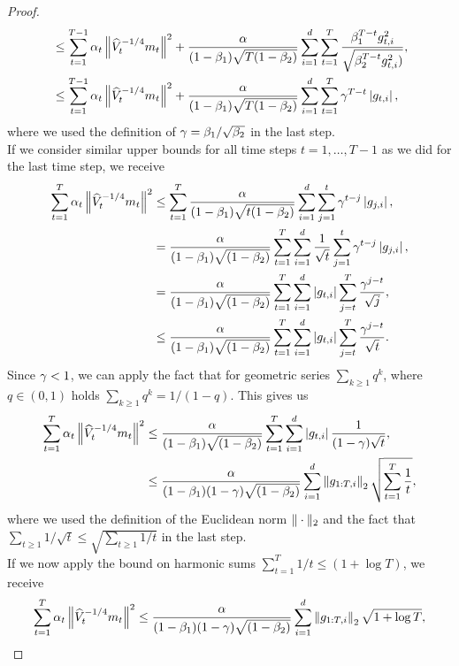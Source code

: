 \begin{proof}
\begin{align*}
&\leq \sum_{t=1}^{T-1} \alpha_t \left\| \widehat{V}_t^{-1/4} m_t \right\|^2 + \frac{\alpha}{(1-\beta_1)\sqrt{T(1-\beta_2)}} \sum_{i=1}^{d} \sum_{t=1}^T\frac{\beta_1^{T-t}g_{t,i}^2}{\sqrt{\beta_2^{T-t}g_{t,i}^2)}},\\
&\leq \sum_{t=1}^{T-1} \alpha_t \left\| \widehat{V}_t^{-1/4} m_t \right\|^2 + \frac{\alpha}{(1-\beta_1)\sqrt{T(1-\beta_2)}} \sum_{i=1}^{d} \sum_{t=1}^T\operatorname{\gamma}^{T-t}\left|g_{t,i}\right|,
\end{align*}
where we used the definition of $\operatorname{\gamma} = \beta_1/\sqrt{\beta_2}$ in the last step.\\
If we consider similar upper bounds for all time steps $t=1,\ldots,T-1$ as we did for the last time step, we receive
\begin{align*}
\sum_{t=1}^T \alpha_t \left\| \widehat{V}_t^{-1/4} m_t \right\|^2 &\leq \sum_{t=1}^T \frac{\alpha}{(1-\beta_1)\sqrt{t(1-\beta_2)}} \sum_{i=1}^{d} \sum_{j=1}^t\operatorname{\gamma}^{t-j}\left|g_{j,i}\right|,\\
&= \frac{\alpha}{(1-\beta_1)\sqrt{(1-\beta_2)}} \sum_{t=1}^T \sum_{i=1}^{d} \frac{1}{\sqrt{t}} \sum_{j=1}^t\operatorname{\gamma}^{t-j}\left|g_{j,i}\right|,\\
&= \frac{\alpha}{(1-\beta_1)\sqrt{(1-\beta_2)}} \sum_{t=1}^T \sum_{i=1}^{d} \left|g_{t,i} \right| \sum_{j=t}^T\frac{\operatorname{\gamma}^{j-t}}{\sqrt{j}},\\
&\leq \frac{\alpha}{(1-\beta_1)\sqrt{(1-\beta_2)}} \sum_{t=1}^T \sum_{i=1}^{d} \left|g_{t,i} \right| \sum_{j=t}^T\frac{\operatorname{\gamma}^{j-t}}{\sqrt{t}}.
\end{align*}
Since $\operatorname{\gamma}<1$, we can apply the fact that for geometric series $\sum_{k\geq 1}q^k$, where $q\in (0,1)$ holds $\sum_{k\geq 1}q^k = 1/(1-q)$. This gives us
\begin{align*}
\sum_{t=1}^T \alpha_t \left\| \widehat{V}_t^{-1/4} m_t \right\|^2 &\leq \frac{\alpha}{(1-\beta_1)\sqrt{(1-\beta_2)}} \sum_{t=1}^T \sum_{i=1}^{d} \left|g_{t,i} \right| \frac{1}{(1-\operatorname{\gamma})\sqrt{t}},\\
&\leq \frac{\alpha}{(1-\beta_1)(1-\operatorname{\gamma})\sqrt{(1-\beta_2)}} \sum_{i=1}^{d} \left\|g_{1:T,i} \right\|_2 \sqrt{\sum_{t=1}^T\frac{1}{t}},\\
\end{align*}
where we used the definition of the Euclidean norm $\|{}\cdot{}\|_2$ and the fact that $\sum_{t\geq 1} 1/\sqrt{t} \leq \sqrt{\sum_{t\geq 1} 1/t}$ in the last step.\\
If we now apply the bound on harmonic sums $\sum_{t=1}^T 1/t \leq (1+\log T)$, we receive
\begin{align}\label{eq:1.11}
\sum_{t=1}^T \a_t \left\| \hat{V}_t^{-1/4} m_t \right\|^2 &\leq \frac{\a}{(1-\b_1)(1-\g)\sqrt{(1-\b_2)}} \sum_{i=1}^{d} \left\|g_{1:T,i} \right\|_2 \sqrt{1 +\log T},\nonumber\\

\end{align}
\end{proof}
